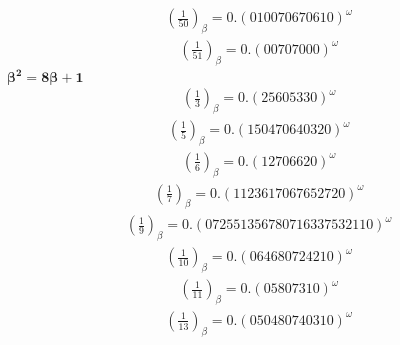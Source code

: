 \documentclass[fleqn]{article}
\begin{document}
\begin{equation*}
\begin{split}
(\frac{1}{50})_\beta = 0.(010070670610)^\omega
\end{split}\end{equation*}
\begin{equation*}
\begin{split}
(\frac{1}{51})_\beta = 0.(00707000)^\omega
\end{split}\end{equation*}
$\boldsymbol{\beta^2 = 8\beta + 1}$
\begin{equation*}
\begin{split}
(\frac{1}{3})_\beta = 0.(25605330)^\omega
\end{split}\end{equation*}
\begin{equation*}
\begin{split}
(\frac{1}{5})_\beta = 0.(150470640320)^\omega
\end{split}\end{equation*}
\begin{equation*}
\begin{split}
(\frac{1}{6})_\beta = 0.(12706620)^\omega
\end{split}\end{equation*}
\begin{equation*}
\begin{split}
(\frac{1}{7})_\beta = 0.(1123617067652720)^\omega
\end{split}\end{equation*}
\begin{equation*}
\begin{split}
(\frac{1}{9})_\beta = 0.(072551356780716337532110)^\omega
\end{split}\end{equation*}
\begin{equation*}
\begin{split}
(\frac{1}{10})_\beta = 0.(064680724210)^\omega
\end{split}\end{equation*}
\begin{equation*}
\begin{split}
(\frac{1}{11})_\beta = 0.(05807310)^\omega
\end{split}\end{equation*}
\begin{equation*}
\begin{split}
(\frac{1}{13})_\beta = 0.(050480740310)^\omega
\end{split}\end{equation*}
\end{document}

